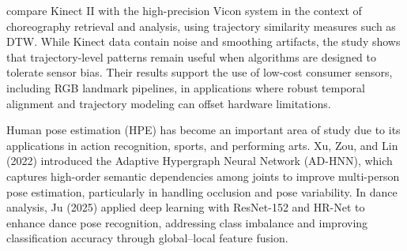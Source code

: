 \citet{trallis2019} compare Kinect II with the high-precision Vicon system in the context of choreography retrieval and analysis, using trajectory similarity measures such as DTW. While Kinect data contain noise and smoothing artifacts, the study shows that trajectory-level patterns remain useful when algorithms are designed to tolerate sensor bias. Their results support the use of low-cost consumer sensors, including RGB landmark pipelines, in applications where robust temporal alignment and trajectory modeling can offset hardware limitations.

Human pose estimation (HPE) has become an important area of study due to its applications in action recognition, sports, and performing arts. Xu, Zou, and Lin (2022) introduced the Adaptive Hypergraph Neural Network (AD-HNN), which captures high-order semantic dependencies among joints to improve multi-person pose estimation, particularly in handling occlusion and pose variability. In dance analysis, Ju (2025) applied deep learning with ResNet-152 and HR-Net to enhance dance pose recognition, addressing class imbalance and improving classification accuracy through global–local feature fusion.

